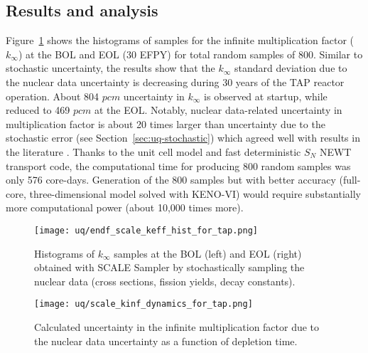 \subsection{Results and analysis}
Figure~\ref{fig:uq-scale-kinf-hist} shows the histograms of samples for the 
infinite multiplication factor ($k_{\infty}$) at the \gls{BOL} and \gls{EOL} 
(30 \gls{EFPY}) for total random samples of 800. Similar to stochastic 
uncertainty, the results show that the $k_{\infty}$ standard deviation due to 
the nuclear data uncertainty is decreasing during 30 years of the \gls{TAP} 
reactor operation. About 804 $pcm$ uncertainty in $k_{\infty}$ is observed at 
startup, while reduced to 469 $pcm$ at the \gls{EOL}. Notably, nuclear 
data-related uncertainty in multiplication factor is about 20 times larger 
than uncertainty due to the stochastic error (see 
Section~\ref{sec:uq-stochastic}) which agreed well with results in the 
literature \cite{takeda_estimation_1999, garcia-herranz_propagation_2008}. 
Thanks to the unit cell model and fast deterministic $S_N$ NEWT transport 
code, the computational time for producing 800 random samples was only 576 
core-days. Generation of the 800 samples but with better accuracy (full-core, 
three-dimensional model solved with KENO-VI) would require substantially more 
computational power (about 10,000 times more).
\begin{figure}[htp!] %
	\centering
	\texttt{[image: uq/endf\_scale\_keff\_hist\_for\_tap.png]}
		\vspace{-8mm}
	\caption{Histograms of $k_{\infty}$ samples at the \gls{BOL} (left) and 
		\gls{EOL} (right) obtained with SCALE Sampler by stochastically 
		sampling the nuclear data (cross sections, fission yields, decay 
		constants).}
	\label{fig:uq-scale-kinf-hist}
\end{figure}
\begin{figure}[hbp!] %
	\centering
	\texttt{[image: uq/scale\_kinf\_dynamics\_for\_tap.png]}
	\caption{Calculated uncertainty in the infinite multiplication factor due 
		to the nuclear data uncertainty as a function of depletion time.}
	\label{fig:uq-scale-kinf}
\end{figure}

